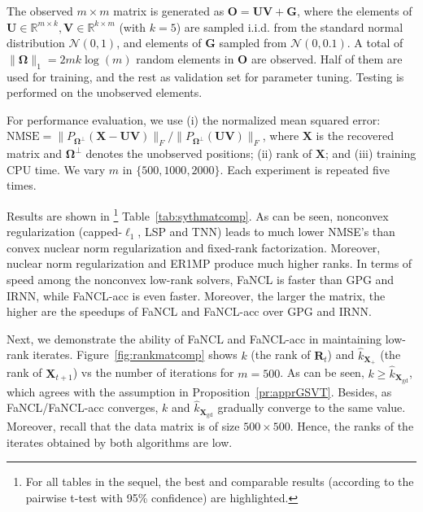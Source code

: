 \documentclass[10pt,journal,compsoc]{IEEEtran}
\def \R{\mathbb R}
\newcommand{\X}{\mathbf{X}}
\newcommand{\NM}[2]{\| #1 \|_{#2} }
\begin{document}
The observed $m\times m$ matrix is generated as 
$\mathbf{O} = \mathbf{U} \mathbf{V} + \mathbf{G}$,  where 
the elements 
of $\mathbf{U} \in \R^{m \times k}, \mathbf{V} \in \R^{k \times m}$ 
(with $k = 5$) are 
sampled i.i.d. from the standard normal distribution $\mathcal{N}(0,
1)$, and
elements of $\mathbf{G}$ sampled from $\mathcal{N}(0, 0.1)$.
A total of $\NM{\mathbf{\Omega}}{1} = 2 m k \log(m)$ random elements
in $\mathbf{O}$ are observed.  
Half of them are used for training, and the rest as validation
set for parameter tuning.
Testing is performed on the unobserved elements.


For performance evaluation,  
we use (i) the normalized mean squared error:
$\text{NMSE} = \NM{P_{\mathbf{\Omega}^{\bot}}(\mathbf{X} - \mathbf{U V})}{F} 
/ \NM{P_{\mathbf{\Omega}^{\bot}}(\mathbf{U V})}{F}$,
where $\mathbf{X}$ is the recovered matrix and
$\mathbf{\Omega}^{\bot}$
denotes the unobserved positions;
(ii) rank of $\mathbf{X}$;
and 
(iii) training CPU time.
We vary $m$ in $\{500, 1000, 2000\}$.
Each experiment is repeated five times.

Results
are shown in 
\footnote{For all tables in the sequel,
	the best and comparable results (according to the pairwise t-test with 95\% confidence) are highlighted.}
Table~\ref{tab:sythmatcomp}.
As can be seen, nonconvex regularization (capped-$\ell_1$, LSP and TNN) leads to much lower NMSE's than 
convex nuclear norm regularization and fixed-rank factorization.
Moreover, 
nuclear norm regularization
and \textsf{ER1MP} produce much higher ranks.
In terms of speed
among the nonconvex low-rank solvers,
\textsf{FaNCL} is faster than 
\textsf{GPG} and \textsf{IRNN},
while \textsf{FaNCL-acc} is even faster. Moreover,
the larger the matrix, the higher are the speedups of \textsf{FaNCL} and \textsf{FaNCL-acc}
over \textsf{GPG} and \textsf{IRNN}.


Next,
we demonstrate 
the ability 
of \textsf{FaNCL} and \textsf{FaNCL-acc}
in maintaining low-rank iterates.
Figure~\ref{fig:rankmatcomp} shows 
$k$
(the rank
of $\mathbf{R}_t$)
and 
$\hat{k}_{\mathbf{X}_+}$
(the rank of $\X_{t + 1}$)
vs the number of iterations for $m=500$.
As can be seen, $k \ge \hat{k}_{\X_{\text{gd}}}$, which agrees with the assumption in 
Proposition~\ref{pr:apprGSVT}.
Besides,
as \textsf{FaNCL/FaNCL-acc} converges,
$k$ and $\hat{k}_{\X_{\text{gd}}}$ gradually converge to the same value. Moreover,
recall that the data matrix is of size $500 \times 500$.
Hence, the ranks of the iterates obtained by both algorithms are low.
\end{document}
